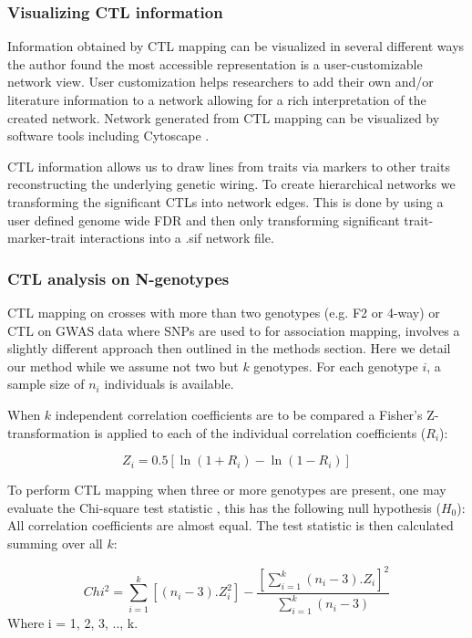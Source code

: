   \subsubsection{Visualizing CTL information}
  Information obtained by CTL mapping can be visualized in several different ways the author found the most accessible 
  representation is a user-customizable network view. User customization helps researchers to add their own and/or 
  literature information to a network allowing for a rich interpretation of the created network. Network generated from 
  CTL mapping can be visualized by software tools including Cytoscape \cite{Cytoscape:2010, Cytoscape:2003}.

  CTL information allows us to draw lines from traits via markers to other traits reconstructing the underlying genetic 
  wiring. To create hierarchical networks we transforming the significant CTLs into network edges. This is done by 
  using a user defined genome wide FDR and then only transforming significant trait-marker-trait interactions into a 
  .sif network file.
  
  \subsubsection{CTL analysis on N-genotypes}
  CTL mapping on crosses with more than two genotypes (e.g. F2 or 4-way) or CTL on GWAS data where SNPs are used to 
  for association mapping, involves a slightly different approach then outlined in the methods section. Here we 
  detail our method while we assume not two but $k$ genotypes. For each genotype $i$, a sample size of $n_{i}$ 
  individuals is available.

  When $k$ independent correlation coefficients are to be compared a Fisher's Z-transformation is applied to each 
  of the individual correlation coefficients ($R_{i}$):

  $$ Z_{i} = 0.5[\ln(1 + R_{i}) - \ln(1-R_{i})] $$

  To perform CTL mapping when three or more genotypes are present, one may evaluate the Chi-square test statistic
  \cite{Kullback:1959, Csiszar:2004}, this has the following null hypothesis ($H_{0}$): All correlation coefficients 
  are almost equal. The test statistic is then calculated summing over all $k$:

  $$ Chi^2 = \sum_{i=1}^{k}[(n_{i} - 3).Z_{i}^2] - \frac{[\sum_{i=1}^{k}(n_{i} - 3).Z_{i}]^2 }{ \sum_{i=1}^{k}(n_{i} - 3) } $$
  Where i = 1, 2, 3, .., k.\\
  
